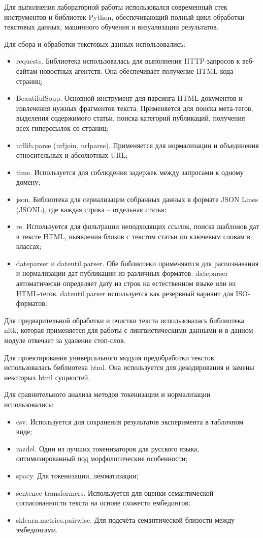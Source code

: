 \documentclass[a4paper,article]{article}
\theoremstyle{mystyle}
\newcommand{\mystyleitemize}[1]{
  \begin{itemize}[label=--, 
				leftmargin=0pt,%
    				labelindent=\parindent,%
    				labelsep=1cm,%
    				itemindent=*,%
    				nolistsep%
    				]
    #1
  \end{itemize}
}
\begin{document}
\begin{sloppypar}
		Для выполнения лабораторной работы использовался современный стек инструментов и библиотек Python, обеспечивающий полный цикл обработки текстовых данных, машинного обучения и визуализации результатов.
		
		Для сбора и обработки текстовых данных использовались:
		
		\mystyleitemize{
    			\item requests. Библиотека использовалась для выполнения HTTP-запросов к веб-сайтам новостных агентств. Она обеспечивает получение HTML-кода страниц;
    			\item BeautifulSoup. Основной инструмент для парсинга HTML-документов и извлечения нужных фрагментов текста. Применяется для поиска мета-тегов, выделения содержимого статьи, поиска категорий публикаций, получения всех гиперссылок со страниц;
    			\item urllib.parse (urljoin, urlparse). Применяется для нормализации и объединения относительных и абсолютных URL;
    			\item time. Используется для соблюдения задержек между запросами к одному домену;
    			\item json. Библиотека для сериализации собранных данных в формате JSON Lines (JSONL), где каждая строка -- отдельная статья;
    			\item re. Используется для фильтрации неподходящих ссылок, поиска шаблонов дат в тексте HTML, выявления блоков с текстом статьи по ключевым словам в классах;
    			\item dateparser и dateutil.parser. Обе библиотеки применяются для распознавания и нормализации дат публикации из различных форматов. dateparser автоматически определяет дату из строк на естественном языке или из HTML-тегов. dateutil.parser используется как резервный вариант для ISO-форматов.
		}
		
		Для предварительной обработки и очистки текста использовалась библиотека nltk, которая применяется для работы с лингвистическими данными и в данном модуле отвечает за удаление стоп-слов.
		
		Для проектирования универсального модуля предобработки текстов использовалась библиотека html. Она используется для декодирования и замены некоторых html сущностей.
		
		Для сравнительного анализа методов токенизации и нормализации использовались:
		
		\mystyleitemize{
    			\item csv. Используется для сохранения результатов эксперимента в табличном виде;
    			\item razdel. Один из лучших токенизаторов для русского языка, оптимизированный под морфологические особенности;
    			\item spacy. Для токенизации, лемматизации;
    			\item sentence-transformers. Используется для оценки семантической согласованности текста на основе схожести ембедингов;
    			\item sklearn.metrics.pairwise. Для подсчёта семантической близости между эмбедингами.
		}
		

\end{sloppypar}
\end{document}

